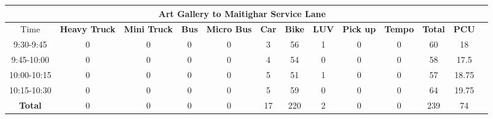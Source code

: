 \begin{landscape}
\begin{table}[h!]
\vspace{0.5cm}
\begin{tabular}{|c|c|c|c|c|c|c|c|c|c|c|c|c|}
    \hline
    \multicolumn{12}{|c|}{\textbf{Art Gallery to Maitighar Service Lane}} \\
    \hline
        Time & \textbf{Heavy Truck} & \textbf{Mini Truck} & \textbf{Bus} & \textbf{Micro Bus} & \textbf{Car} & \textbf{Bike} & \textbf{LUV} & \textbf{Pick up} & \textbf{Tempo} & \textbf{\textbf{Total}} & \textbf{PCU} \\
    \hline
9:30-9:45	&0	&0	&0	&0	&3	&56	&1	&0	&0	&60	&18 \\ \hline
9:45-10:00	&0	&0	&0	&0	&4	&54	&0	&0	&0	&58	&17.5 \\ \hline
10:00-10:15	&0	&0	&0	&0	&5	&51	&1	&0	&0	&57	&18.75 \\ \hline
10:15-10:30	&0	&0	&0	&0	&5	&59	&0	&0	&0	&64	&19.75 \\ \hline
\textbf{Total}	&0	&0	&0	&0	&17	&220	&2	&0	&0	&239&74 \\ \hline

    \hline
\end{tabular}

\end{table}
\end{landscape}


